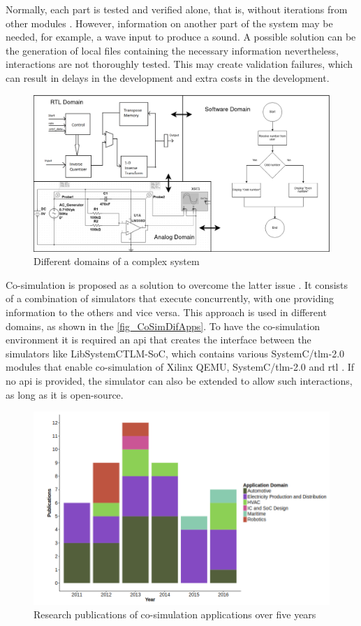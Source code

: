 Normally, each part is tested and verified alone, that is, without iterations from other modules \cite{gomes2017co}. However, information on another part of the system may be needed, for example, a wave input to produce a sound. A possible solution can be the generation of local files containing the necessary information nevertheless, interactions are not thoroughly tested. This may create validation failures, which can result in delays in the development and extra costs in the development.

\begin{figure}[]
	\centering
 	\includegraphics[width=0.9\linewidth]{Images/DomainsComplexSystem.png}
 	\caption{Different domains of a complex system}
	 \label{fig_DomainsComplexSystem}
\end{figure}

Co-simulation is proposed as a solution to overcome the latter issue \cite{gomes2017co}. It consists of a combination of simulators that execute concurrently, with one providing information to the others and vice versa. This approach is used in different domains, as shown in the \autoref{fig_CoSimDifApps}. To have the co-simulation environment it is required an \gls{api} that creates the interface between the simulators like LibSystemCTLM-SoC, which contains various SystemC/\gls{tlm}-2.0 modules that enable co-simulation of Xilinx QEMU, SystemC/\gls{tlm}-2.0 and \gls{rtl} \cite{XilinxLibsystemctlm-SOC}. If no \gls{api} is provided, the simulator can also be extended to allow such interactions, as long
as it is open-source.

\begin{figure}[]
	\centering
 	\includegraphics[width=0.7\linewidth]{Images/CoSimDifApps.png}
 	\caption{Research publications of co-simulation applications over five years\cite{gomes2017co}}
	 \label{fig_CoSimDifApps}
\end{figure}

